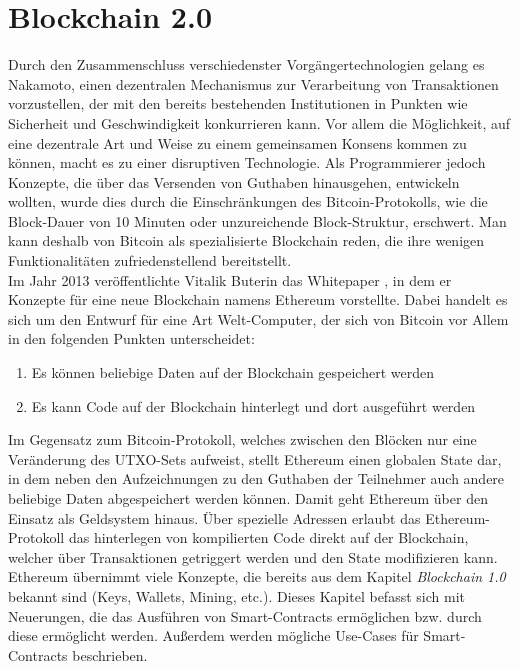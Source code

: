\chapter{Blockchain 2.0}
Durch den Zusammenschluss verschiedenster Vorgängertechnologien gelang es Nakamoto, einen dezentralen Mechanismus zur Verarbeitung von Transaktionen vorzustellen, der mit den bereits bestehenden Institutionen in Punkten wie Sicherheit und Geschwindigkeit konkurrieren kann. Vor allem die Möglichkeit, auf eine dezentrale Art und Weise zu einem gemeinsamen Konsens kommen zu können, macht es zu einer disruptiven Technologie. Als Programmierer jedoch Konzepte, die über das Versenden von Guthaben hinausgehen, entwickeln wollten, wurde dies durch die Einschränkungen des Bitcoin-Protokolls, wie die Block-Dauer von 10 Minuten oder unzureichende Block-Struktur, erschwert. Man kann deshalb von Bitcoin als spezialisierte Blockchain reden, die ihre wenigen Funktionalitäten zufriedenstellend bereitstellt.\\
Im Jahr 2013 veröffentlichte Vitalik Buterin das Whitepaper \cite{buterin_whitepaper_2013}, in dem er Konzepte für eine neue Blockchain namens Ethereum vorstellte. Dabei handelt es sich um den Entwurf für eine Art Welt-Computer, der sich von Bitcoin vor Allem in den folgenden Punkten unterscheidet:
\begin{enumerate}
	\item Es können beliebige Daten auf der Blockchain gespeichert werden
	\item Es kann Code auf der Blockchain hinterlegt und dort ausgeführt werden
	\end{enumerate}
Im Gegensatz zum Bitcoin-Protokoll, welches zwischen den Blöcken nur eine Veränderung des UTXO-Sets aufweist, stellt Ethereum einen globalen State dar, in dem neben den Aufzeichnungen zu den Guthaben der Teilnehmer auch andere beliebige Daten abgespeichert werden können. Damit geht Ethereum über den Einsatz als Geldsystem hinaus.
Über spezielle Adressen erlaubt das Ethereum-Protokoll das hinterlegen von kompilierten Code direkt auf der Blockchain, welcher über Transaktionen getriggert werden und den State modifizieren kann. 
\\
Ethereum übernimmt viele Konzepte, die bereits aus dem Kapitel \emph{Blockchain 1.0} bekannt sind (Keys, Wallets, Mining, etc.). Dieses Kapitel befasst sich mit Neuerungen, die das Ausführen von Smart-Contracts ermöglichen bzw. durch diese ermöglicht werden. Außerdem werden mögliche Use-Cases für Smart-Contracts beschrieben.
